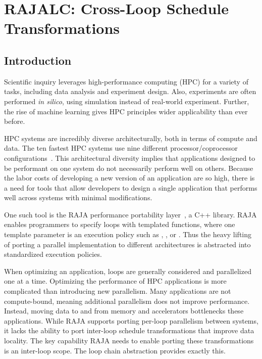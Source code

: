\chapter{RAJALC: Cross-Loop Schedule Transformations}

\section{Introduction}
Scientific inquiry leverages high-performance computing (HPC) for a variety of
tasks, including data analysis and experiment design. 
Also, experiments are often performed \textit{in silico}, using 
simulation instead of real-world experiment.
Further, the rise of machine learning gives HPC principles wider
applicability than ever before.

HPC systems are incredibly diverse architecturally, 
both in terms of compute and data.
The ten fastest HPC systems use nine different processor/coprocessor
configurations~\cite{top500}.
This architectural diversity implies that applications designed to be
performant on one system do not necessarily perform well on others.
Because the labor costs of developing a new version of an application are so high, 
there is a need for tools that allow developers to design a single application
that performs well across systems with minimal modifications.

One such tool is the RAJA performance portability layer~\cite{RAJA}, a C++ library.
RAJA enables programmers to specify loops with templated functions,
where one template parameter is an execution policy such as 
, , or .
Thus the heavy lifting of porting a parallel implementation to different 
architectures is abstracted into standardized execution policies.


When optimizing an application, loops are generally considered and
parallelized one at a time.
Optimizing the performance of HPC applications is more complicated than introducing new parallelism.
Many applications are not compute-bound, meaning additional parallelism does not improve performance. 
Instead, moving data to and from memory and accelerators bottlenecks these applications. 
While RAJA supports porting per-loop parallelism between systems, it lacks the ability to port inter-loop schedule transformations that improve data locality. 
The key capability RAJA needs to enable porting these transformations is an inter-loop scope.
The loop chain abstraction provides exactly this.

